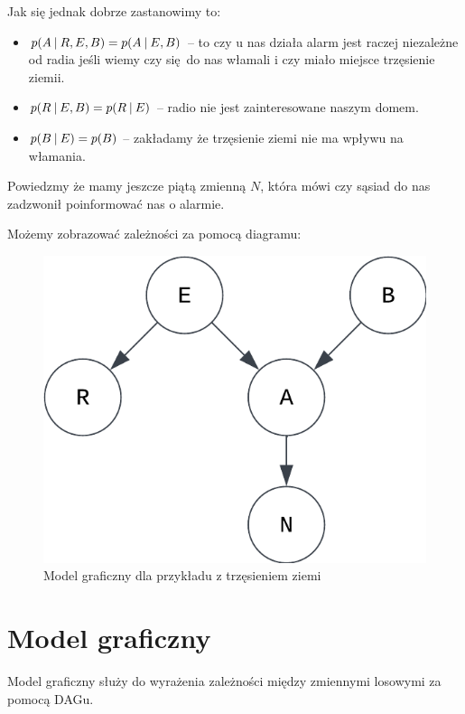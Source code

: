 Jak się jednak dobrze zastanowimy to:
\begin{itemize}
    \item \( p(A \:\vert\: R, E, B) = p(A \:\vert\: E, B) \) -- to czy u nas działa alarm jest raczej niezależne od radia jeśli wiemy czy się do nas włamali i czy miało miejsce trzęsienie ziemii.
    
    \item \( p(R \:\vert\: E, B) = p(R \:\vert\: E) \) -- radio nie jest zainteresowane naszym domem.
    
    \item \( p(B \:\vert\: E) = p(B) \) -- zakładamy że trzęsienie ziemi nie ma wpływu na włamania.
\end{itemize}

Powiedzmy że mamy jeszcze piątą zmienną \( N \), która mówi czy sąsiad do nas zadzwonił poinformować nas o alarmie.

Możemy zobrazować zależności za pomocą diagramu:

\begin{figure}[H]
    \centering
    \includegraphics{chapters/graphical models/img/example.png}
    \caption{Model graficzny dla przykładu z trzęsieniem ziemi}
\end{figure}

\section{Model graficzny}

Model graficzny służy do wyrażenia zależności między zmiennymi losowymi za pomocą DAGu.

